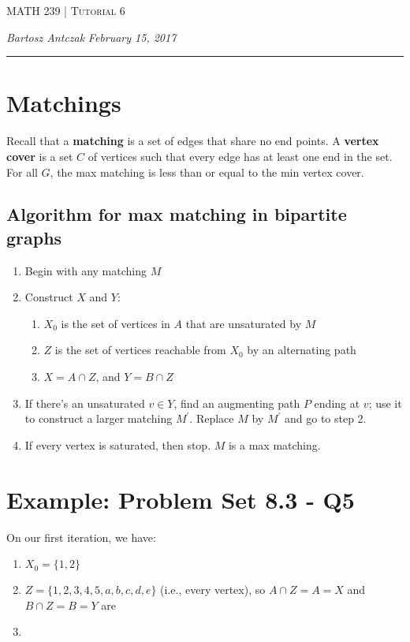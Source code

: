 \documentclass{report}
\newcommand{\lectureNum}{6}
\newcommand{\curDate}{February 15, 2017}
\newcommand{\course}{MATH 239}
\begin{document}
\begin{center}
\begin{Large}
\textsc{\course{} | Tutorial \lectureNum{}}
\end{Large}
\end{center} 
\noindent \textit{Bartosz Antczak} \hfill
\textit{\curDate{}}
\rule{\textwidth}{0.4pt}
\section*{Matchings}
Recall that a \textbf{matching} is a set of edges that share no end points. A \textbf{vertex cover} is a set $C$ of vertices such that every edge has at least one end in the set. For all $G$, the max matching is less than or equal to the min vertex cover.
\subsection*{Algorithm for max matching in bipartite graphs}
\begin{enumerate}
\item Begin with any matching $M$
\item Construct $X$ and $Y$:
\begin{enumerate}
\item $X_0$ is the set of vertices in $A$ that are unsaturated by $M$
\item $Z$ is the set of vertices reachable from $X_0$ by an alternating path
\item $X = A \cap Z$, and $Y = B \cap Z$
\end{enumerate}
\item If there's an unsaturated $v \in Y$, find an augmenting path $P$ ending at $v$; use it to construct a larger matching $M^\prime$. Replace $M$ by $M^\prime$ and go to step 2.
\item If every vertex is saturated, then stop. $M$ is a max matching.
\end{enumerate}

\section*{Example: Problem Set 8.3 - Q5}
On our first iteration, we have:
\begin{enumerate}
\item $X_0 = \{1,2\}$
\item $Z = \{1,2,3,4,5, a,b,c,d,e\}$ (i.e., every vertex), so $A \cap Z = A = X$ and $B \cap Z = B = Y$ are  
\item 
\end{enumerate}
\end{document}
